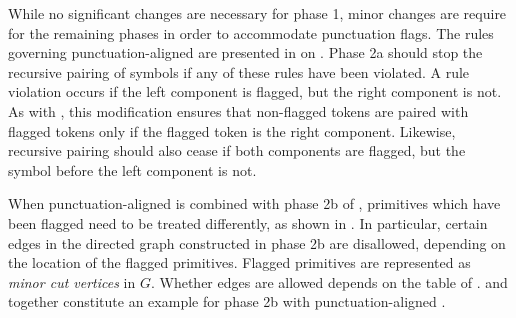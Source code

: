 While no significant changes are necessary for phase 1,
minor changes are require
for the remaining phases in order to accommodate 
punctuation flags.  The rules governing
punctuation-aligned \repair are presented in 
 on 
.
Phase 2a should stop the recursive pairing of symbols 
if any of these rules have been violated.  A rule violation
occurs if the left component is flagged, but the right 
component is not.  As with \repair, 
this modification ensures that non-flagged tokens are paired 
with flagged tokens only if the flagged token is the 
right component.  Likewise, recursive pairing should also cease if 
both components are flagged, but the symbol before the 
left component is not.  

When punctuation-aligned \repair is combined with phase 2b 
of \remerge, primitives which have been flagged need to be treated 
differently, as shown in .  
In particular, certain edges in the directed graph constructed
in phase 2b are disallowed, depending
on the location of the flagged primitives.  Flagged
primitives are represented as {\emph {minor cut vertices}}
in $G$.  Whether edges are allowed depends on the table of
.  
 and 
 together constitute an
example for phase 2b with punctuation-aligned \repair.

